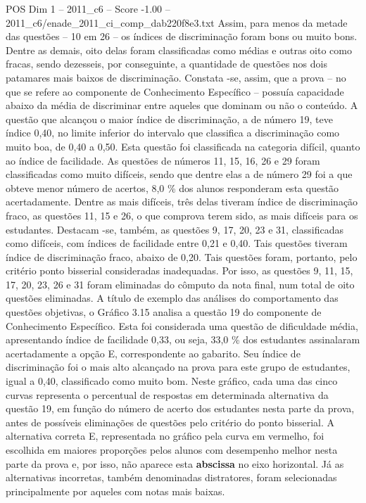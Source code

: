 \begin{textsample}{POS Dim 1 – 2011\_c6 – Score -1.00 – 2011\_c6/enade\_2011\_ci\_comp\_dab220f8e3.txt}
Assim, para menos da metade das questões – 10 em 26 – os índices de discriminação foram bons ou muito bons.
Dentre as demais, oito delas foram classificadas como médias e outras oito como fracas, sendo dezesseis, por conseguinte, a quantidade de questões nos dois patamares mais baixos de discriminação.
Constata -se, assim, que a prova – no que se refere ao componente de Conhecimento Específico – possuía capacidade abaixo da média de discriminar entre aqueles que dominam ou não o conteúdo.
A questão que alcançou o maior índice de discriminação, a de número 19, teve índice 0,40, no limite inferior do intervalo que classifica a discriminação como muito boa, de 0,40 a 0,50.
Esta questão foi classificada na categoria difícil, quanto ao índice de facilidade.
As questões de números 11, 15, 16, 26 e 29 foram classificadas como muito difíceis, sendo que dentre elas a de número 29 foi a que obteve menor número de acertos, 8,0 \% dos alunos responderam esta questão acertadamente.
Dentre as mais difíceis, três delas tiveram índice de discriminação fraco, as questões 11, 15 e 26, o que comprova terem sido, as mais difíceis para os estudantes.
Destacam -se, também, as questões 9, 17, 20, 23 e 31, classificadas como difíceis, com índices de facilidade entre 0,21 e 0,40.
Tais questões tiveram índice de discriminação fraco, abaixo de 0,20.
Tais questões foram, portanto, pelo critério ponto bisserial consideradas inadequadas.
Por isso, as questões 9, 11, 15, 17, 20, 23, 26 e 31 foram eliminadas do cômputo da nota final, num total de oito questões eliminadas.
A título de exemplo das análises do comportamento das questões objetivas, o Gráfico 3.15 analisa a questão 19 do componente de Conhecimento Específico.
Esta foi considerada uma questão de dificuldade média, apresentando índice de facilidade 0,33, ou seja, 33,0 \% dos estudantes assinalaram acertadamente a opção E, correspondente ao gabarito.
Seu índice de discriminação foi o mais alto alcançado na prova para este grupo de estudantes, igual a 0,40, classificado como muito bom.
Neste gráfico, cada uma das cinco curvas representa o percentual de respostas em determinada alternativa da questão 19, em função do número de acerto dos estudantes nesta parte da prova, antes de possíveis eliminações de questões pelo critério do ponto bisserial.
A alternativa correta E, representada no gráfico pela curva em vermelho, foi escolhida em maiores proporções pelos alunos com desempenho melhor nesta parte da prova e, por isso, não aparece esta \textbf{abscissa} no eixo horizontal.
Já as alternativas incorretas, também denominadas distratores, foram selecionadas principalmente por aqueles com notas mais baixas.

\end{textsample}
